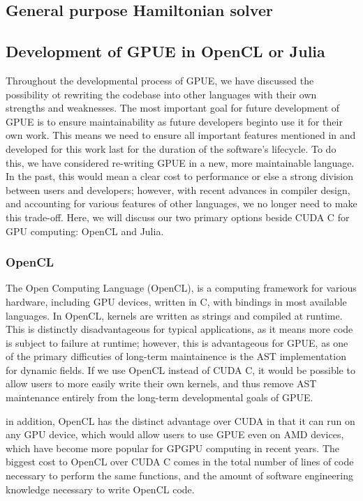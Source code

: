 \subsection{General purpose Hamiltonian solver}

\subsection{Development of GPUE in OpenCL or Julia}

Throughout the developmental process of GPUE, we have discussed the possibility ot rewriting the codebase into other languages with their own strengths and weaknesses.
The most important goal for future development of GPUE is to ensure maintainability as future developers beginto use it for their own work.
This means we need to ensure all important features mentioned in and developed for this work last for the duration of the software's lifecycle.
To do this, we have considered re-writing GPUE in a new, more maintainable language.
In the past, this would mean a clear cost to performance or else a strong division between users and developers; however, with recent advances in compiler design, and accounting for various features of other languages, we no longer need to make this trade-off.
Here, we will discuss our two primary options beside CUDA C for GPU computing: OpenCL and Julia.

\subsubsection{OpenCL}
The Open Computing Language (OpenCL), is a computing framework for various hardware, including GPU devices, written in C, with bindings in most available languages.
In OpenCL, kernels are written as strings and compiled at runtime.
This is distinctly disadvantageous for typical applications, as it means more code is subject to failure at runtime; however, this is advantageous for GPUE, as one of the primary difficuties of long-term maintainence is the AST implementation for dynamic fields.
If we use OpenCL instead of CUDA C, it would be possible to allow users to more easily write their own kernels, and thus remove AST maintenance entirely from the long-term developmental goals of GPUE.

in addition, OpenCL has the distinct advantage over CUDA in that it can run on any GPU device, which would allow users to use GPUE even on AMD devices, which have become more popular for GPGPU computing in recent years.
The biggest cost to OpenCL over CUDA C comes in the total number of lines of code necessary to perform the same functions, and the amount of software engineering knowledge necessary to write OpenCL code.

